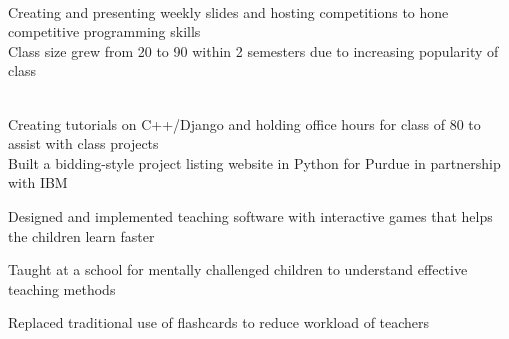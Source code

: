 \documentclass[]{resume_openfont}
\begin{document}
\begin{minipage}[t]{0.66\textwidth}
\begin{tightemize}
\item {}  \\ 
\textbullet{} Creating and presenting weekly slides and hosting competitions to hone competitive programming skills \\
\textbullet{} Class size grew from 20 to 90 within 2 semesters due to increasing popularity of class \\
\item {}\\
\textbullet{} Creating tutorials on C++/Django and holding office hours for class of 80 to assist with class projects \\
\textbullet{} Built a bidding-style project listing website in Python for Purdue in partnership with IBM \\
\end{tightemize}
\sectionsep

\begin{tightemize}
\item Designed and implemented teaching software with interactive games that helps the children learn faster
\item Taught at a school for mentally challenged children to understand effective teaching methods
\item Replaced traditional use of flashcards to reduce workload of teachers
\end{tightemize}
\sectionsep

\end{minipage} 
\end{document}
